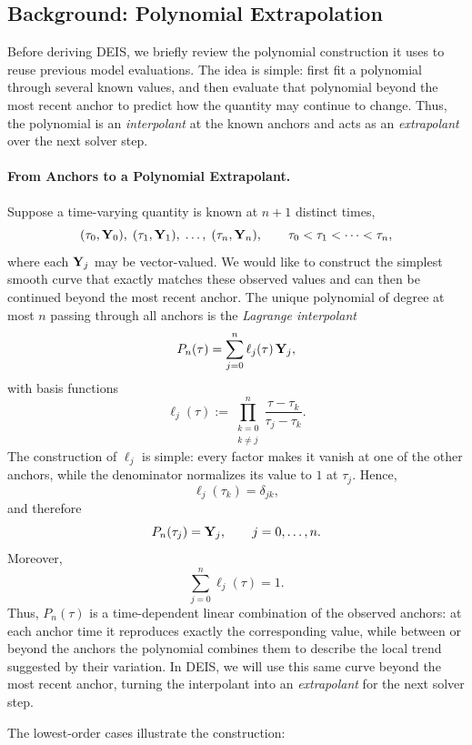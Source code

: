 \subsection{Background: Polynomial Extrapolation}
\label{subsec:poly-extrapolation}

Before deriving DEIS, we briefly review the polynomial construction it uses
to reuse previous model evaluations. The idea is simple: first fit a
polynomial through several known values, and then evaluate that polynomial
beyond the most recent anchor to predict how the quantity may continue to
change. Thus, the polynomial is an \emph{interpolant} at the known anchors
and acts as an \emph{extrapolant} over the next solver step.

\paragraph{From Anchors to a Polynomial Extrapolant.}
Suppose a time-varying quantity is known at $n{+}1$ distinct times,
\[
(\tau_0,{\mathbf{Y}}_0),\;
(\tau_1,{\mathbf{Y}}_1),\;
\ldots,\;
(\tau_n,{\mathbf{Y}}_n),
\qquad
\tau_0<\tau_1<\cdots<\tau_n,
\]
where each ${\mathbf{Y}}_j$ may be vector-valued. We would like to construct the
simplest smooth curve that exactly matches these observed values and can then
be continued beyond the most recent anchor. The unique polynomial of degree at
most $n$ passing through all anchors is the \emph{Lagrange interpolant}
\[
P_n(\tau)
=
\sum_{j=0}^{n}
\ell_j(\tau)\,{\mathbf{Y}}_j,
\]
with basis functions
\[
\ell_j(\tau)
:=
\prod_{\substack{k=0\\k\neq j}}^{n}
\frac{\tau-\tau_k}{\tau_j-\tau_k}.
\]
The construction of $\ell_j$ is simple: every factor makes it vanish at one
of the other anchors, while the denominator normalizes its value to $1$ at
$\tau_j$. Hence,
\[
\ell_j(\tau_k)=\delta_{jk},
\]
and therefore
\[
P_n(\tau_j)={\mathbf{Y}}_j,
\qquad
j=0,\ldots,n.
\]
Moreover,
\[
\sum_{j=0}^{n}\ell_j(\tau)=1.
\]
Thus, $P_n(\tau)$ is a time-dependent linear combination of the observed
anchors: at each anchor time it reproduces exactly the corresponding value,
while between or beyond the anchors the polynomial combines them to describe
the local trend suggested by their variation. In DEIS, we will use this same
curve beyond the most recent anchor, turning the interpolant into an
\emph{extrapolant} for the next solver step.

The lowest-order cases illustrate the construction:


